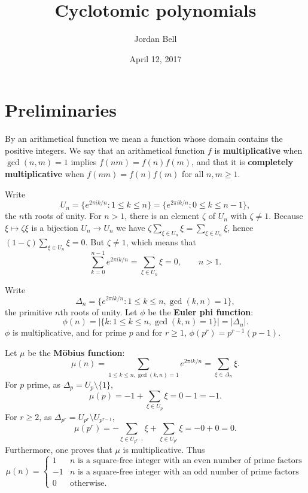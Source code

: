 \documentclass{article}
\theoremstyle{definition}
\theoremstyle{definition}
\begin{document}
\title{Cyclotomic polynomials}
\author{Jordan Bell}
\date{April 12, 2017}

\maketitle

\section{Preliminaries}
By an arithmetical function we mean a function whose domain contains the positive integers. We say that an arithmetical function $f$ is
\textbf{multiplicative} when $\gcd(n,m)=1$ implies $f(nm)=f(n)f(m)$, and that it is \textbf{completely multiplicative} when $f(nm)=f(n)f(m)$ for all $n,m \geq 1$.

Write
\[
U_n=\{e^{2\pi ik/n}: 1 \leq k \leq n\} = \{e^{2\pi ik/n}: 0 \leq k \leq n-1\},
\]
 the  $n$th roots of unity. 
For $n>1$, there is an element  $\zeta$ of $U_n$ with $\zeta \neq 1$. Because $\xi \mapsto \zeta \xi$ is a bijection $U_n \to U_n$ we have
$\zeta \sum_{\xi \in U_n} \xi = \sum_{\xi \in U_n} \xi$,
hence $(1-\zeta) \sum_{\xi \in U_n} \xi = 0$. But $\zeta \neq 1$, which means that
\[
\sum_{k=0}^{n-1} e^{2\pi ik/n} = \sum_{\xi \in U_n} \xi = 0,\qquad n>1.
\]


Write
\[
\Delta_n = \{e^{2\pi ik/n}: 1 \leq k \leq n, \gcd(k,n)=1\},
\]
 the primitive $n$th roots
of unity. 
Let $\phi$ be the \textbf{Euler phi function}:
\[
\phi(n) = |\{k: 1 \leq k \leq n, \gcd(k,n)=1\}|=|\Delta_n|.
\]
$\phi$ is multiplicative, and for prime $p$ and for $r \geq 1$, $\phi(p^r)=p^{r-1}(p-1)$.



Let $\mu$ be the \textbf{M\"obius function}:
\[
\mu(n) =\sum_{1\le k\le n, \gcd(k,n)=1} e^{2\pi ik/n}
=
 \sum_{\xi \in \Delta_n} \xi.
\]
For $p$ prime, as $\Delta_p = U_p \setminus \{1\}$,
\[
\mu(p) = -1+\sum_{\xi \in U_p} \xi  = 0-1=-1.
\]
For $r \geq 2$, as $\Delta_{p^r} = U_{p^r} \setminus U_{p^{r-1}}$,
\[
\mu(p^r) =-\sum_{\xi \in U_{p^{r-1}}} \xi+ \sum_{\xi \in U_{p^r}} \xi = -0+0=0.
\]
Furthermore, one proves  that $\mu$ is multiplicative. Thus
\[
\mu(n) =
\begin{cases}
1&\textrm{$n$ is a square-free integer with an even number of prime factors}\\
-1&\textrm{$n$ is a square-free integer with an odd number of prime factors}\\
0&\textrm{otherwise}.
\end{cases}
\]
\end{document}
